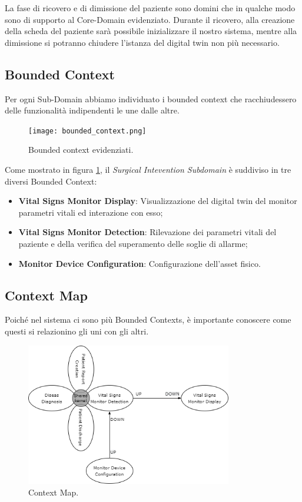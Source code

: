 La fase di ricovero e di dimissione del paziente sono domini che in qualche modo sono di supporto al Core-Domain evidenziato.
\newline Durante il ricovero, alla creazione della scheda del paziente sarà possibile inizializzare il nostro sistema, mentre alla dimissione si potranno chiudere l'istanza del digital twin non più necessario.

\subsection{Bounded Context}

Per ogni Sub-Domain abbiamo individuato i bounded context che racchiudessero delle funzionalità indipendenti le une dalle altre.

\begin{figure}[H]
    \texttt{[image: bounded\_context.png]}
    \centering
    \caption{\label{pic:bounded-context}Bounded context evidenziati.}
\end{figure}

Come mostrato in figura     \ref{pic:bounded-context}, il \textit{Surgical Intevention Subdomain} è suddiviso in tre diversi Bounded Context:

\begin{itemize}
    \item \textbf{Vital Signs Monitor Display}: Visualizzazione del digital twin del monitor parametri vitali ed interazione con esso;
    \item \textbf{Vital Signs Monitor Detection}: Rilevazione dei parametri vitali del paziente e della verifica del superamento delle soglie di allarme;
    \item \textbf{Monitor Device Configuration}: Configurazione dell'asset fisico. 
\end{itemize}

\subsection{Context Map}
Poiché nel sistema ci sono più Bounded Contexts, è importante conoscere come questi si relazionino gli uni con gli altri.

\begin{figure}[H]
    \includegraphics[width=9cm]{Images/contextMap.png}
    \centering
    \caption{\label{pic:context-map}Context Map.}
\end{figure}

